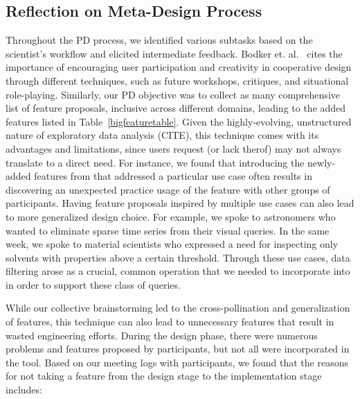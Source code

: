 \subsection{Reflection on Meta-Design Process}
\par Throughout the PD process, we identified various subtasks based on the scientist's workflow and elicited intermediate feedback.
Bodker et. al.~\cite{BodkerGronbaek} cites the importance of encouraging user participation and creativity in cooperative design through different techniques, such as future workshops, critiques, and situational role-playing. Similarly, our PD objective was to collect as many comprehensive list of feature proposals, inclusive across different domains, leading to the added features listed in Table~\ref{bigfeaturetable}. Given the highly-evolving, unstructured nature of exploratory data analysis (CITE), this technique comes with its advantages and limitations, since users request (or lack therof) may not always translate to a direct need. For instance, we found that introducing the newly-added features from \zvpp that addressed a particular use case often results in discovering an unexpected practice usage of the feature with other groups of participants. Having feature proposals inspired by multiple use cases can also lead to more generalized design choice. For example, we spoke to astronomers who wanted to eliminate sparse time series from their visual queries. In the same week, we spoke to material scientists who expressed a need for inspecting only solvents with properties above a certain threshold. Through these use cases, data filtering arose as a crucial, common operation that we needed to incorporate into \zvpp in order to support these class of queries.
\par While our collective brainstorming led to the cross-pollination and generalization of features, this technique can also lead to unnecessary features that result in wasted engineering efforts. During the design phase, there were numerous problems and features proposed by participants, but not all were incorporated in the tool. Based on our meeting logs with participants, we found that the reasons for not taking a feature from the design stage to the implementation stage includes:
